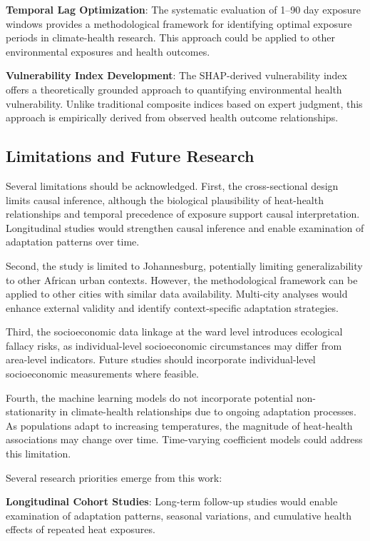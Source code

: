 \documentclass[journal,article,submit,pdftex,moreauthors]{Definitions/mdpi}
\begin{document}
\textbf{Temporal Lag Optimization}: The systematic evaluation of 1--90 day exposure windows provides a methodological framework for identifying optimal exposure periods in climate-health research. This approach could be applied to other environmental exposures and health outcomes.

\textbf{Vulnerability Index Development}: The SHAP-derived vulnerability index offers a theoretically grounded approach to quantifying environmental health vulnerability. Unlike traditional composite indices based on expert judgment, this approach is empirically derived from observed health outcome relationships.

\subsection{Limitations and Future Research}

Several limitations should be acknowledged. First, the cross-sectional design limits causal inference, although the biological plausibility of heat-health relationships and temporal precedence of exposure support causal interpretation. Longitudinal studies would strengthen causal inference and enable examination of adaptation patterns over time.

Second, the study is limited to Johannesburg, potentially limiting generalizability to other African urban contexts. However, the methodological framework can be applied to other cities with similar data availability. Multi-city analyses would enhance external validity and identify context-specific adaptation strategies.

Third, the socioeconomic data linkage at the ward level introduces ecological fallacy risks, as individual-level socioeconomic circumstances may differ from area-level indicators. Future studies should incorporate individual-level socioeconomic measurements where feasible.

Fourth, the machine learning models do not incorporate potential non-stationarity in climate-health relationships due to ongoing adaptation processes. As populations adapt to increasing temperatures, the magnitude of heat-health associations may change over time. Time-varying coefficient models could address this limitation.

Several research priorities emerge from this work:

\textbf{Longitudinal Cohort Studies}: Long-term follow-up studies would enable examination of adaptation patterns, seasonal variations, and cumulative health effects of repeated heat exposures.
\end{document}
